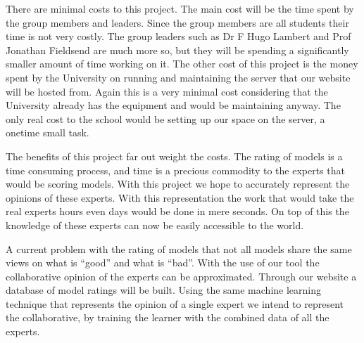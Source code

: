 \documentclass{ecmm427_assignment}
\begin{document}
\quad There are minimal costs to this project. The main cost will be the time spent by the group members and leaders. Since the group members are all students their time is not very costly. The group leaders such as Dr F Hugo Lambert and Prof Jonathan Fieldsend are much more so, but they will be spending a significantly smaller amount of time working on it. The other cost of this project is the money spent by the University on running and maintaining the server that our website will be hosted from. Again this is a very minimal cost considering that the University already has the equipment and would be maintaining anyway. The only real cost to the school would be setting up our space on the server, a onetime small task.\par

\quad The benefits of this project far out weight the costs. The rating of models is a time consuming process, and time is a precious commodity to the experts that would be scoring models. With this project we hope to accurately represent the opinions of these experts. With this representation the work that would take the real experts hours even days would be done in mere seconds. On top of this the knowledge of these experts can now be easily accessible to the world. \par

\quad A current problem with the rating of models that not all models share the same views on what is “good” and what is “bad”. With the use of our tool the collaborative opinion of the experts can be approximated. Through our website a database of model ratings will be built. Using the same machine learning technique that represents the opinion of a single expert we intend to represent the collaborative, by training the learner with the combined data of all the experts.\par




\end{document}
